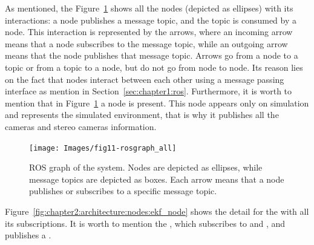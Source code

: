 As mentioned, the Figure~\ref{fig:chapter2:architecture:nodes:all} shows all the nodes (depicted as ellipses) with its interactions: a node publishes a message topic, and the topic is consumed by a node. This interaction is represented by the arrows, where an incoming arrow means that a node subscribes to the message topic, while an outgoing arrow means that the node publishes that message topic. Arrows go from a node to a topic or from a topic to a node, but do not go from node to node. Its reason lies on the fact that nodes interact between each other using a message passing interface as mention in Section~\ref{sec:chapter1:ros}. Furthermore, it is worth to mention that in Figure~\ref{fig:chapter2:architecture:nodes:all} a  node is present. This node appears only on simulation and represents the simulated environment, that is why it publishes all the cameras and stereo cameras information.\\
\begin{figure}
    \centering
    \texttt{[image: Images/fig11-rosgraph\_all]}
    \caption[ROS graph of the system]{ROS graph of the system. Nodes are depicted as ellipses, while message topics are depicted as boxes. Each arrow means that a node publishes or subscribes to a specific message topic.}
    \label{fig:chapter2:architecture:nodes:all}
\end{figure}
Figure~\ref{fig:chapter2:architecture:nodes:ekf_node} shows the detail for the  with all its subscriptions. It is worth to mention the , which subscribes to  and , and publishes a .

